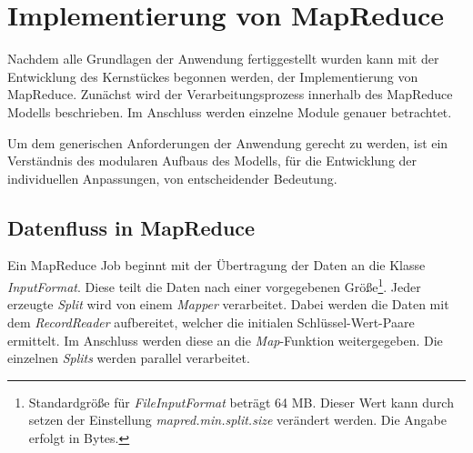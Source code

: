 


\section{Implementierung von MapReduce}
Nachdem alle Grundlagen der Anwendung fertiggestellt wurden kann mit der Entwicklung des Kernstückes begonnen werden, der Implementierung von MapReduce. Zunächst wird der Verarbeitungsprozess innerhalb des MapReduce Modells beschrieben. Im Anschluss werden einzelne Module genauer betrachtet.

Um dem generischen Anforderungen der Anwendung gerecht zu werden, ist ein Verständnis des modularen Aufbaus des Modells, für die Entwicklung der individuellen Anpassungen, von entscheidender Bedeutung. 

\subsection{Datenfluss in MapReduce}
Ein MapReduce Job beginnt mit der Übertragung der Daten an die Klasse \textit{InputFormat}. Diese teilt die Daten nach einer vorgegebenen Größe\footnote{Standardgröße für \textit{FileInputFormat} beträgt 64 \ac{MB}. Dieser Wert kann durch setzen der Einstellung \textit{mapred.min.split.size} verändert werden. Die Angabe erfolgt in Bytes.}. Jeder erzeugte \textit{Split} wird von einem \textit{Mapper} verarbeitet. Dabei werden die Daten mit dem \textit{RecordReader} aufbereitet, welcher die initialen Schlüssel-Wert-Paare ermittelt. Im Anschluss werden diese an die \textit{Map}-Funktion weitergegeben. Die einzelnen \textit{Splits} werden parallel verarbeitet.

